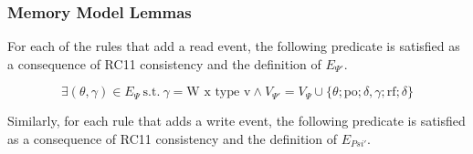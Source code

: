 

\subsubsection{Memory Model Lemmas}

For each of the rules that add a read event, the following predicate is satisfied as a consequence of RC11 consistency and the definition of \(E_{\Psi'}\).

\[
    \exists (\theta, \gamma) \in E_{\Psi} \: \text{s.t.} \: \gamma = \text{W x type v} \wedge V_{\Psi'} = V_{\Psi} \cup \{ \theta ; \text{po}; \delta, \gamma; \text{rf}; \delta \} 
\]

Similarly,  for each rule that adds a write event, the following predicate is satisfied as a consequence of RC11 consistency and the definition of \(E_{Psi'}\). 

